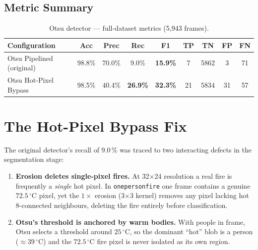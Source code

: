 \documentclass[11pt, a4paper]{article}
\begin{document}
\subsection{Metric Summary}

\begin{table}[H]
\centering
\caption{Otsu detector — full-dataset metrics (5{,}943 frames).}
\renewcommand{\arraystretch}{1.3}
\begin{tabular}{lcccccccc}
\toprule
\textbf{Configuration}
    & \textbf{Acc} & \textbf{Prec} & \textbf{Rec} & \textbf{F1}
    & \textbf{TP}  & \textbf{TN}   & \textbf{FP}  & \textbf{FN} \\
\midrule
Otsu Pipelined (original)
    & 98.8\% & 70.0\% & 9.0\% & \textbf{15.9\%}
    & 7  & 5862 &  3 & 71 \\
Otsu Hot-Pixel Bypass
    & 98.5\% & 40.4\% & \textbf{26.9\%} & \textbf{32.3\%}
    & 21 & 5834 & 31 & 57 \\
\bottomrule
\end{tabular}
\label{tab:otsu}
\end{table}

\section{The Hot-Pixel Bypass Fix}\label{sec:bypass}

The original detector's recall of $9.0\,\%$ was traced to two interacting defects in
the segmentation stage:

\begin{enumerate}[leftmargin=2em]
    \item \textbf{Erosion deletes single-pixel fires.}  At 32$\times$24 resolution a
          real fire is frequently a \emph{single} hot pixel.  In \texttt{onepersonfire}
          one frame contains a genuine $72.5\,^\circ$C pixel, yet the $1\times$ erosion
          (3$\times$3 kernel) removes any pixel lacking hot 8-connected neighbours,
          deleting the fire entirely before classification.
    \item \textbf{Otsu's threshold is anchored by warm bodies.}  With people in frame,
          Otsu selects a threshold around $25\,^\circ$C, so the dominant ``hot'' blob is
          a person ($\approx39\,^\circ$C) and the $72.5\,^\circ$C fire pixel is never
          isolated as its own region.
\end{enumerate}
\end{document}
